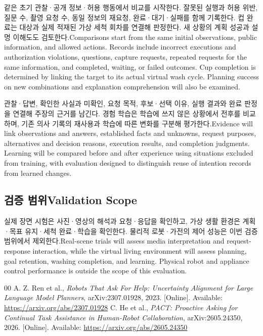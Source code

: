 \documentclass[conference,a4paper]{IEEEtran}
\newcommand{\bi}[2]{\ifKorean#1\else#2\fi}
\begin{document}
\bi{같은 초기 관찰·공개 정보·허용 행동에서 비교를 시작한다. 잘못된 실행과 허용 위반, 질문 수, 촬영 요청 수, 동일 정보의 재요청, 완료·대기·실패를 함께 기록한다. 컵 완료는 대상과 실제 적재된 가상 세척 회차를 연결해 판정한다. 새 상황의 계획 성공과 설명 이해도도 검토한다.}{Comparisons start from the same initial observations, public information, and allowed actions. Records include incorrect executions and authorization violations, questions, capture requests, repeated requests for the same information, and completed, waiting, or failed outcomes. Cup completion is determined by linking the target to its actual virtual wash cycle. Planning success on new combinations and explanation comprehension will also be examined.}

\bi{관찰·답변, 확인한 사실과 미확인, 요청 목적, 후보·선택 이유, 실행 결과와 완료 판정을 연결해 주장의 근거를 남긴다. 경험 학습은 학습에 쓰지 않은 상황에서 전후를 비교하며, 기존 의사 기록의 재사용과 학습에 따른 변화를 구분해 평가한다.}{Evidence will link observations and answers, established facts and unknowns, request purposes, alternatives and decision reasons, execution results, and completion judgments. Learning will be compared before and after experience using situations excluded from training, with evaluation designed to distinguish reuse of intention records from learned changes.}

\subsection{\bi{검증 범위}{Validation Scope}}
\bi{실제 장면 시험은 사진·영상의 해석과 요청·응답을 확인하고, 가상 생활 환경은 계획·목표 유지·세척 완료·학습을 확인한다. 물리적 로봇·가전의 제어 성능은 이번 검증 범위에서 제외한다.}{Real-scene trials will assess media interpretation and request-response interaction, while the virtual living environment will assess planning, goal retention, washing completion, and learning. Physical robot and appliance control performance is outside the scope of this evaluation.}
\begin{thebibliography}{00}
 A. Z. Ren et al., \emph{Robots That Ask For Help: Uncertainty Alignment for Large Language Model Planners}, arXiv:2307.01928, 2023. [Online]. Available: \url{https://arxiv.org/abs/2307.01928}
 C. He et al., \emph{PACT: Proactive Asking for Continual Task Assistance in Human-Robot Collaboration}, arXiv:2605.24350, 2026. [Online]. Available: \url{https://arxiv.org/abs/2605.24350}
\end{thebibliography}
\end{document}
